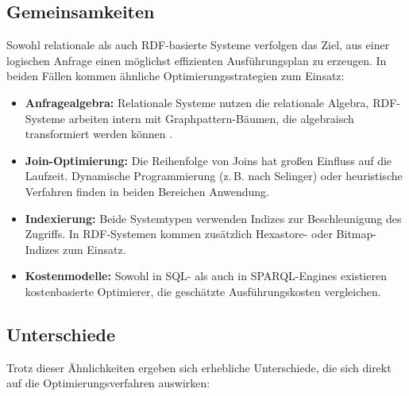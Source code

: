 \documentclass[12pt]{article}
\begin{document}
\subsection{Gemeinsamkeiten}

Sowohl relationale als auch RDF-basierte Systeme verfolgen das Ziel, aus einer logischen Anfrage einen möglichst effizienten Ausführungsplan zu erzeugen. In beiden Fällen kommen ähnliche Optimierungsstrategien zum Einsatz:

\begin{itemize}
    \item \textbf{Anfragealgebra:} Relationale Systeme nutzen die relationale Algebra, RDF-Systeme arbeiten intern mit Graphpattern-Bäumen, die algebraisch transformiert werden können \cite{perez2009semantics}.
    \item \textbf{Join-Optimierung:} Die Reihenfolge von Joins hat großen Einfluss auf die Laufzeit. Dynamische Programmierung (z.\,B. nach Selinger) oder heuristische Verfahren finden in beiden Bereichen Anwendung.
    \item \textbf{Indexierung:} Beide Systemtypen verwenden Indizes zur Beschleunigung des Zugriffs. In RDF-Systemen kommen zusätzlich Hexastore- oder Bitmap-Indizes zum Einsatz.
    \item \textbf{Kostenmodelle:} Sowohl in SQL- als auch in SPARQL-Engines existieren kostenbasierte Optimierer, die geschätzte Ausführungskosten vergleichen.
\end{itemize}

\subsection{Unterschiede}

Trotz dieser Ähnlichkeiten ergeben sich erhebliche Unterschiede, die sich direkt auf die Optimierungsverfahren auswirken:
\end{document}
